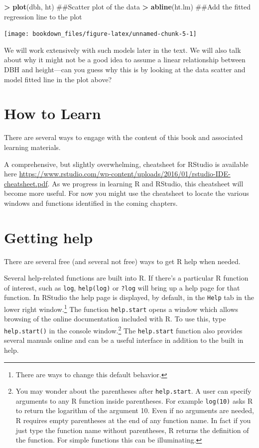\documentclass[]{krantz}
\makeatletter
\newenvironment{Shaded}{\begin{snugshade}}{\end{snugshade}}
\newcommand{\KeywordTok}[1]{\textcolor[rgb]{0.27,0.27,0.27}{\textbf{#1}}}
\newcommand{\StringTok}[1]{\textcolor[rgb]{0.5,0.5,0.5}{#1}}
\newcommand{\OperatorTok}[1]{\textcolor[rgb]{0.43,0.43,0.43}{\textbf{#1}}}
\newcommand{\NormalTok}[1]{#1}
\newenvironment{kframe}{%
\medskip{}
\setlength{\fboxsep}{.8em}
 \def\at@end@of@kframe{}%
 \ifinner\ifhmode%
  \def\at@end@of@kframe{\end{minipage}}%
  \begin{minipage}{\columnwidth}%
 \fi\fi%
 \def\FrameCommand##1{\hskip\@totalleftmargin \hskip-\fboxsep
 \colorbox{shadecolor}{##1}\hskip-\fboxsep
     \hskip-\linewidth \hskip-\@totalleftmargin \hskip\columnwidth}%
 \MakeFramed {\advance\hsize-\width
   \@totalleftmargin\z@ \linewidth\hsize
   \@setminipage}}%
 {\par\unskip\endMakeFramed%
 \at@end@of@kframe}
\renewenvironment{Shaded}{\begin{kframe}}{\end{kframe}}
\theoremstyle{definition}
\theoremstyle{definition}
\theoremstyle{definition}
\theoremstyle{remark}
\makeatother
\begin{document}
\begin{Shaded}
\begin{Highlighting}[]
\OperatorTok{>}\StringTok{ }\KeywordTok{plot}\NormalTok{(dbh, ht)  ##Scatter plot of the data}
\OperatorTok{>}\StringTok{ }\KeywordTok{abline}\NormalTok{(ht.lm)  ##Add the fitted regression line to the plot}
\end{Highlighting}
\end{Shaded}

\begin{center}\texttt{[image: bookdown\_files/figure-latex/unnamed-chunk-5-1]} \end{center}

We will work extensively with such models later in the text. We will
also talk about why it might not be a good idea to assume a linear
relationship between DBH and height---can you guess why this is by
looking at the data scatter and model fitted line in the plot above?

\section{How to Learn}\label{how-to-learn}

There are several ways to engage with the content of this book and
associated learning materials.

A comprehensive, but slightly overwhelming, cheatsheet for RStudio is
available here
\url{https://www.rstudio.com/wp-content/uploads/2016/01/rstudio-IDE-cheatsheet.pdf}.
As we progress in learning R and RStudio, this cheatsheet will become
more useful. For now you might use the cheatsheet to locate the various
windows and functions identified in the coming chapters.

\section{Getting help}\label{getting-help}

There are several free (and several not free) ways to get R help when
needed.

Several help-related functions are built into R. If there's a particular
R function of interest, such as \texttt{log}, \texttt{help(log)} or
\texttt{?log} will bring up a help page for that function. In RStudio
the help page is displayed, by default, in the \texttt{Help} tab in the
lower right window.\footnote{There are ways to change this default
  behavior.} The function \texttt{help.start} opens a window which
allows browsing of the online documentation included with R. To use
this, type \texttt{help.start()} in the console window.\footnote{You may
  wonder about the parentheses after \texttt{help.start}. A user can
  specify arguments to any R function inside parentheses. For example
  \texttt{log(10)} asks R to return the logarithm of the argument 10.
  Even if no arguments are needed, R requires empty parentheses at the
  end of any function name. In fact if you just type the function name
  without parentheses, R returns the definition of the function. For
  simple functions this can be illuminating.} The \texttt{help.start}
function also provides several manuals online and can be a useful
interface in addition to the built in help.
\end{document}
